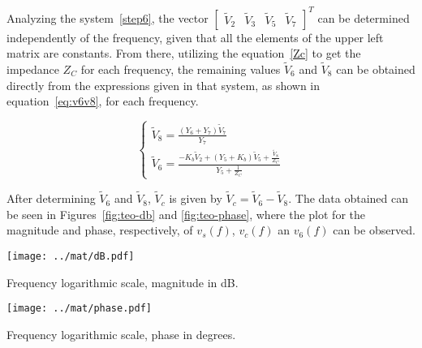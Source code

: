 Analyzing the system~\ref{step6}, the vector $\begin{bmatrix} \tilde{V}_2 & \tilde{V}_3 & \tilde{V}_5 & \tilde{V}_7 \end{bmatrix}^T$ can be determined independently of the frequency, given that all the elements of the upper left matrix are constants. From there, utilizing the equation~\ref{Zc} to get the impedance $Z_C$ for each frequency, the remaining values $\tilde{V}_6$ and $\tilde{V}_8$ can be obtained directly from the expressions given in that system, as shown in equation~\ref{eq:v6v8}, for each frequency. 

\begin{equation}
    \label{eq:v6v8}
    \begin{cases}
    \tilde{V}_8 = \frac{\left( Y_6 + Y_7\right)\tilde{V}_7}{Y_7} \\
    \tilde{V}_6 = \frac{-K_b\tilde{V}_2 + \left( Y_5+K_b\right)\tilde{V}_5 + \frac{\tilde{V}_8}{Z_C}}{Y_5+\frac{1}{Z_C}}
    \end{cases}
\end{equation}

After determining $\tilde{V}_6$ and $\tilde{V}_8$, $\tilde{V}_c$ is given by $\tilde{V}_c = \tilde{V}_6 - \tilde{V}_8$. The data obtained can be seen in Figures~\ref{fig:teo-db} and \ref{fig:teo-phase}, where the plot for the magnitude and phase, respectively, of $v_s(f)$, $v_c(f)$ an $v_6(f)$ can be observed.\\

\begin{minipage}[b]{0.48\textwidth}
\centering
    \texttt{[image: ../mat/dB.pdf]}
    \captionsetup{type=figure}
\caption{Frequency logarithmic scale, magnitude in dB.}
\label{fig:teo-db}
\end{minipage}
\begin{minipage}[b]{0.48\textwidth}
\centering
    \texttt{[image: ../mat/phase.pdf]}
    \captionsetup{type=figure}
  \caption{Frequency logarithmic scale, phase in degrees.}
  \label{fig:teo-phase}
\end{minipage}
